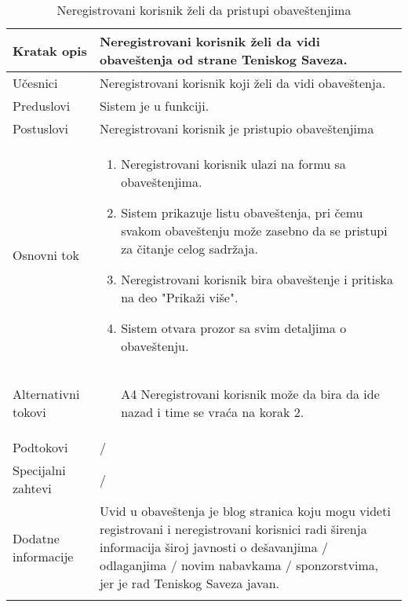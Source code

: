 \documentclass{article}
\begin{document}
        \begin{longtable}{| p{} | p{} |} 
            \hline
                Kratak opis & Neregistrovani korisnik želi da vidi obaveštenja od strane Teniskog Saveza.\\ 
            \hline    
                Učesnici & Neregistrovani korisnik koji želi da vidi obaveštenja. \\
            \hline
               Preduslovi &  Sistem je u funkciji.\\
            \hline  
                Postuslovi &  Neregistrovani korisnik je pristupio obaveštenjima\\
            \hline
                Osnovni tok & \begin{enumerate}
                    \item Neregistrovani korisnik ulazi na formu sa obaveštenjima.
                    \item Sistem prikazuje listu obaveštenja, pri čemu svakom obaveštenju može zasebno da se pristupi za čitanje celog sadržaja.
                    \item Neregistrovani korisnik bira obaveštenje i pritiska na deo "Prikaži više".
                    \item Sistem otvara prozor sa svim detaljima o obaveštenju.
                \end{enumerate}\\
            \hline
                Alternativni tokovi & \begin{itemize}
                    \item[A4] Neregistrovani korisnik može da bira da ide nazad i time se vraća na korak 2.
                \end{itemize}\\
            \hline
                Podtokovi & /\\
            \hline
                Specijalni zahtevi & /\\
            \hline
                Dodatne informacije & Uvid u obaveštenja je blog stranica koju mogu videti registrovani i neregistrovani korisnici radi širenja informacija široj javnosti o dešavanjima / odlaganjima / novim nabavkama / sponzorstvima, jer je rad Teniskog Saveza javan.\\
            \hline
            \caption{Neregistrovani korisnik želi da pristupi obaveštenjima} 
        \end{longtable}
\end{document}
